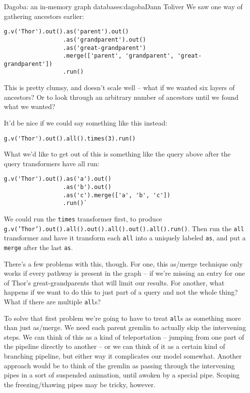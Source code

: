 \begin{aosachapter}{Dagoba: an in-memory graph database}{s:dagoba}{Dann Toliver}
We saw one way of gathering ancestors earlier:

\begin{verbatim}
g.v('Thor').out().as('parent').out()
                 .as('grandparent').out()
                 .as('great-grandparent')
                 .merge(['parent', 'grandparent', 'great-grandparent'])
                 .run()
\end{verbatim}

This is pretty clumsy, and doesn't scale well -- what if we wanted six
layers of ancestors? Or to look through an arbitrary number of ancestors
until we found what we wanted?

It'd be nice if we could say something like this instead:

\begin{verbatim}
g.v('Thor').out().all().times(3).run()
\end{verbatim}

What we'd like to get out of this is something like the query above
after the query transformers have all run:

\begin{verbatim}
g.v('Thor').out().as('a').out()
                 .as('b').out()
                 .as('c').merge(['a', 'b', 'c'])
                 .run()`
\end{verbatim}

We could run the \texttt{times} transformer first, to produce
\linebreak \texttt{g.v('Thor').out().all().out().all().out().all().run()}.
Then run the \texttt{all} transformer and have it transform each
\texttt{all} into a uniquely labeled \texttt{as}, and put a
\texttt{merge} after the last \texttt{as}.

There's a few problems with this, though. For one, this as/merge
technique only works if every pathway is present in the graph -- if
we're missing an entry for one of Thor's great-grandparents that will
limit our results. For another, what happens if we want to do this to
just part of a query and not the whole thing? What if there are multiple
\texttt{all}s?

To solve that first problem we're going to have to treat \texttt{all}s
as something more than just as/merge. We need each parent gremlin to
actually skip the intervening steps. We can think of this as a kind of
teleportation -- jumping from one part of the pipeline directly to
another -- or we can think of it as a certain kind of branching
pipeline, but either way it complicates our model somewhat. Another
approach would be to think of the gremlin as passing through the
intervening pipes in a sort of suspended animation, until awoken by a
special pipe. Scoping the freezing/thawing pipes may be tricky, however.


\end{aosachapter}
